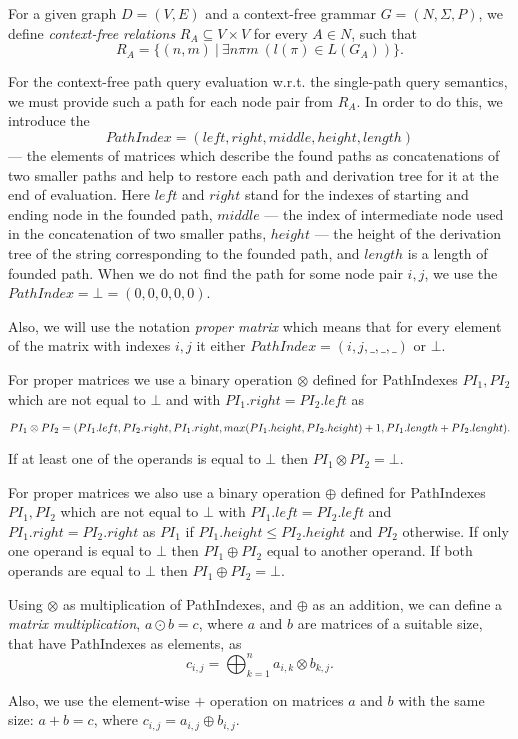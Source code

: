 For a given graph \mbox{$D = (V, E)$} and a context-free grammar $G = (N, \Sigma, P)$, we define \emph{context-free relations} \mbox{$R_A \subseteq V \times V$} for every \mbox{$A \in N$}, such that $$R_A = \{(n,m)~|~\exists n \pi m~(l(\pi) \in L(G_A))\}.$$

For the context-free path query evaluation w.r.t. the single-path query semantics, we must provide such a path for each node pair from $R_A$. In order to do this, we introduce the $$PathIndex = (left,right,middle,height,length)$$ --- the elements of matrices which describe the found paths as concatenations of two smaller paths and help to restore each path and derivation tree for it at the end of evaluation. Here $left$ and $right$ stand for the indexes of starting and ending node in the founded path, $middle$ --- the index of intermediate node used in the concatenation of two smaller paths, $height$ --- the height of the derivation tree of the string corresponding to the founded path, and $length$ is a length of founded path. When we do not find the path for some node pair $i,j$, we use the $PathIndex = \bot = (0,0,0,0,0)$.

Also, we will use the notation \textit{proper matrix} which means that for every element of the matrix with indexes $i,j$ it either $PathIndex = (i,j,\_,\_,\_)$ or $\bot$.

For proper matrices we use a binary operation $\otimes$ defined for PathIndexes \mbox{$PI_1, PI_2$} which are not equal to $\bot$ and with $PI_1.right = PI_2.left$ as 

$PI_1 \otimes PI_2 = (PI_1.left, PI_2.right, PI_1.right, \\ max(PI_1.height, PI_2.height)+1,PI_1.length + PI_2.lenght).$

If at least one of the operands is equal to $\bot$ then $PI_1 \otimes PI_2 = \bot$.

For proper matrices we also use a binary operation $\oplus$ defined for PathIndexes \mbox{$PI_1, PI_2$} which are not equal to $\bot$ with $PI_1.left = PI_2.left$ and $PI_1.right = PI_2.right$ as $PI_1$ if $PI_1.height \leq PI_2.height$ and $PI_2$ otherwise. If only one operand is equal to $\bot$ then $PI_1 \oplus PI_2$ equal to another operand. If both operands are equal to $\bot$ then $PI_1 \oplus PI_2 = \bot$.

Using $\otimes$ as multiplication of PathIndexes, and $\oplus$ as an addition, we can define a \emph{matrix multiplication}, \mbox{$a \odot b = c$}, where $a$ and $b$ are matrices of a suitable size, that have PathIndexes as elements, as $$c_{i,j} = \bigoplus^{n}_{k=1}{a_{i,k} \otimes b_{k,j}}.$$

Also, we use the element-wise $+$ operation on matrices $a$ and $b$ with the same size: \mbox{$a + b = c$}, where $c_{i,j} = a_{i,j} \oplus b_{i,j}.$
